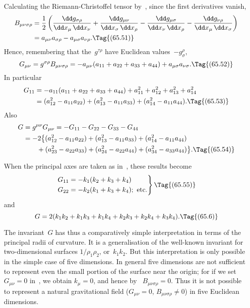 \documentclass[12pt]{book}
\begin{document}
Calculating the Riemann\hyp{}Christoffel tensor by~, since the first derivatives
vanish,
\begin{align*}
  B_{\mu\nu\sigma\rho}
  &= \frac{1}{2}\left(\frac{\dd g_{\sigma\rho}}{\dd x_{\mu}\, \dd x_{\nu}}
  + \frac{\dd g_{\mu\nu}}{\dd x_{\sigma}\, \dd x_{\rho}}
  - \frac{\dd g_{\mu\sigma}}{\dd x_{\nu}\, \dd x_{\rho}}
  - \frac{\dd g_{\nu\rho}}{\dd x_{\mu}\, \dd x_{\sigma}}\right) \\
  &= a_{\mu\nu} a_{\sigma\rho} - a_{\mu\sigma} a_{\nu\rho}.
  \Tag{(65.51)}
\end{align*}
Hence, remembering that the~$g^{\tau\rho}$ have Euclidean values~$-g_{\sigma}^{\rho}$,
\[
G_{\mu\nu} = g^{\sigma\rho} B_{\mu\nu\sigma\rho}
= -a_{\mu\nu} (a_{11} + a_{22} + a_{33} + a_{44}) + a_{\mu\sigma} a_{\nu\sigma}.
\Tag{(65.52)}
\]
In particular
\begin{align*}
  G_{11}
  &= -a_{11} (a_{11} + a_{22} + a_{33} + a_{44}) + a_{11}^{2} + a_{12}^{2} + a_{13}^{2} + a_{14}^{2} \\
  &= (a_{12}^{2} - a_{11} a_{22}) + (a_{13}^{2} - a_{11} a_{33}) + (a_{14}^{2} - a_{11} a_{44}).
  \Tag{(65.53)}
\end{align*}
Also
\begin{align*}
  G &= g^{\mu\nu} G_{\mu\nu}
  = -G_{11} - G_{22} - G_{33} - G_{44} \\
  &= -2 \bigl\{(a_{12}^{2} - a_{11} a_{22}) + (a_{13}^{2} - a_{11} a_{33}) + (a_{14}^{2} - a_{11} a_{44}) \\
  &\qquad + (a_{23}^{2} - a_{22} a_{33}) + (a_{24}^{2} - a_{22} a_{44}) + (a_{34}^{2} - a_{33} a_{44})\bigr\}.
  \Tag{(65.54)}
\end{align*}

When the principal axes are taken as in~, these results become
\[
\left.
\begin{aligned}
  G_{11} &= -k_{1}(k_{2} + k_{3} + k_{4})\\
  G_{22} &= -k_{2}(k_{1} + k_{3} + k_{4});\ \text{etc.}
\end{aligned}
\right\}
\Tag{(65.55)}
\]
and
\[
G = 2(k_{1}k_{2} + k_{1}k_{3} + k_{1} k_{4} + k_{2} k_{3} + k_{2} k_{4} + k_{3} k_{4}).
\Tag{(65.6)}
\]

The invariant~$G$ has thus a comparatively simple interpretation in terms
of the principal radii of curvature. It is a generalisation of the well-known
%
%
invariant for two\hyp{}dimensional surfaces $1/\rho_{1}\rho_{2}$, or~$k_{1} k_{2}$. But this interpretation
is only possible in the simple case of five dimensions. In general five dimensions
are not sufficient to represent even the small portion of the surface near the
origin; for if we set $G_{\mu\nu} = 0$ in~, we obtain $k_{\mu} = 0$, and hence by~
$B_{\mu\nu\sigma\rho} = 0$. Thus it is not possible to represent a natural gravitational field
($G_{\mu\nu} = 0$, $B_{\mu\nu\sigma\rho} \neq 0$) in five Euclidean dimensions.
\end{document}
